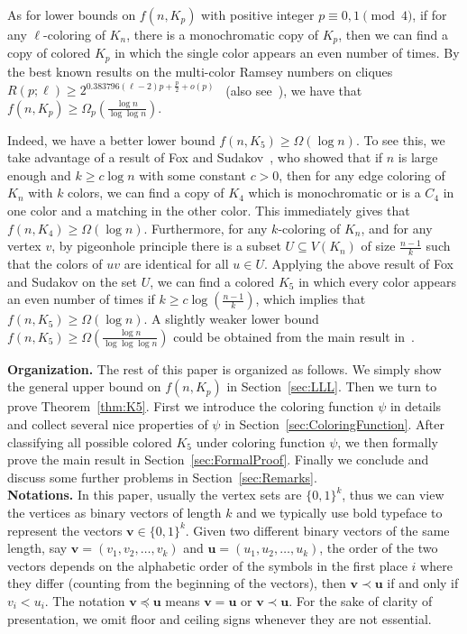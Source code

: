\documentclass[11pt]{article}
\theoremstyle{definition}
\begin{document}
As for lower bounds on $f(n,K_{p})$ with positive integer $p\equiv 0,1\pmod{4}$, if for any $\ell$-coloring of $K_{n}$, there is a monochromatic copy of $K_{p}$, then we can find a copy of colored $K_{p}$ in which the single color appears an even number of times. By the best known results on the multi-color Ramsey numbers on cliques $R(p;\ell)\ge 2^{0.383796(\ell-2)p+\frac{p}{2}+o(p)}$~\cite{2022JCTASawin} (also see~\cite{2021ADVConlonFerber,2021PAMSWigderson}), we have that $f(n,K_{p})\ge\Omega_{p}(\frac{\log{n}}{\log{\log{n}}})$. 

Indeed, we have a better lower bound $f(n,K_{5})\ge\Omega(\log{n})$. To see this, we take advantage of a result of Fox and Sudakov~\cite{2008SIAMFoxSudakov}, who showed that if $n$ is large enough and $k\ge c\log{n}$ with some constant $c>0$, then for any edge coloring of $K_{n}$ with $k$ colors, we can find a copy of $K_{4}$ which is monochromatic or is a $C_{4}$ in one color and a matching in the other color. This immediately gives that $f(n,K_{4})\ge\Omega(\log{n})$. Furthermore, for any $k$-coloring of $K_{n}$, and for any vertex $v$, by pigeonhole principle there is a subset $U\subseteq V(K_{n})$ of size $\frac{n-1}{k}$ such that the colors of $uv$ are identical for all $u\in U$. Applying the above result of Fox and Sudakov on the set $U$, we can find a colored $K_{5}$ in which every color appears an even number of times if $k\ge c\log{(\frac{n-1}{k})}$, which implies that $f(n,K_{5})\ge\Omega(\log{n})$. A slightly weaker lower bound $f(n,K_{5})\ge\Omega(\frac{\log{n}}{\log{\log{\log{n}}}})$ could be obtained from the main result in~\cite{2008CPCMubayi}.

\medskip

\noindent\textbf{Organization.} The rest of this paper is organized as follows. We simply show the general upper bound on $f(n,K_{p})$ in Section~\ref{sec:LLL}. Then we turn to prove Theorem~\ref{thm:K5}. First we introduce the coloring function $\psi$ in details and collect several nice properties of $\psi$ in Section~\ref{sec:ColoringFunction}. After classifying all possible colored $K_{5}$ under coloring function $\psi$, we then formally prove the main result in Section~\ref{sec:FormalProof}. Finally we conclude and discuss some further problems in Section~\ref{sec:Remarks}.\\

{\bf \noindent Notations.} In this paper, usually the vertex sets are $\{0,1\}^{k}$, thus we can view the vertices as binary vectors of length $k$ and we typically use bold typeface to represent the vectors $\boldsymbol{v}\in\{0,1\}^{k}$. Given two different binary vectors of the same length, say $\boldsymbol{v}=(v_{1},v_{2},\ldots,v_{k})$ and $\boldsymbol{u}=(u_{1},u_{2},\ldots,u_{k})$, the order of the two vectors depends on the alphabetic order of the symbols in the first place $i$ where they differ (counting from the beginning of the vectors), then $\boldsymbol{v}\prec\boldsymbol{u}$ if and only if $v_{i}<u_{i}$. The notation $\boldsymbol{v}\preceq\boldsymbol{u}$ means $\boldsymbol{v}=\boldsymbol{u}$ or $\boldsymbol{v}\prec\boldsymbol{u}$. For the sake of clarity of presentation, we omit floor and ceiling signs whenever they are not essential.
\end{document}
